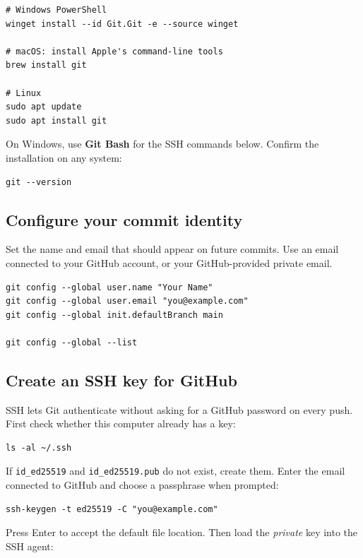 \begin{lstlisting}[style=mlterminal]
# Windows PowerShell
winget install --id Git.Git -e --source winget

# macOS: install Apple's command-line tools
brew install git

# Linux
sudo apt update
sudo apt install git
\end{lstlisting}

On Windows, use \textbf{Git Bash} for the SSH commands below. Confirm the installation on any system:

\begin{lstlisting}[style=mlterminal]
git --version
\end{lstlisting}

\subsection{Configure your commit identity}

Set the name and email that should appear on future commits. Use an email
connected to your GitHub account, or your GitHub-provided private email.

\begin{lstlisting}[style=mlterminal]
git config --global user.name "Your Name"
git config --global user.email "you@example.com"
git config --global init.defaultBranch main

git config --global --list
\end{lstlisting}

\subsection{Create an SSH key for GitHub}

SSH lets Git authenticate without asking for a GitHub password on every push.
First check whether this computer already has a key:

\begin{lstlisting}[style=mlterminal]
ls -al ~/.ssh
\end{lstlisting}

If \texttt{id\_ed25519} and \texttt{id\_ed25519.pub} do not exist, create them.
Enter the email connected to GitHub and choose a passphrase when prompted:

\begin{lstlisting}[style=mlterminal]
ssh-keygen -t ed25519 -C "you@example.com"
\end{lstlisting}

Press Enter to accept the default file location. Then load the \emph{private}
key into the SSH agent:

